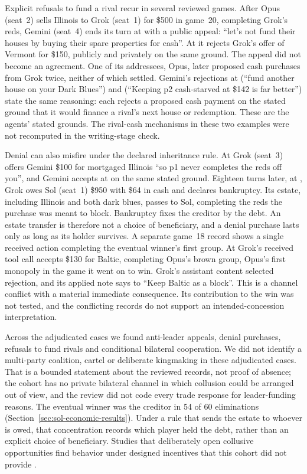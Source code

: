 Explicit refusals to fund a rival recur in several reviewed games. After Opus (seat~2) sells Illinois to Grok (seat~1) for \$500 in game~20, completing Grok's reds, Gemini (seat~4) ends its turn at  with a public appeal: ``let's not fund their houses by buying their spare properties for cash''. At  it rejects Grok's offer of Vermont for \$150, publicly and privately on the same ground. The appeal did not become an agreement. One of its addressees, Opus, later proposed cash purchases from Grok twice, neither of which settled. Gemini's rejections at  (``fund another house on your Dark Blues'') and  (``Keeping p2 cash-starved at \$142 is far better'') state the same reasoning: each rejects a proposed cash payment on the stated ground that it would finance a rival's next house or redemption. These are the agents' stated grounds. The rival-cash mechanisms in these two examples were not recomputed in the writing-stage check.

Denial can also misfire under the declared inheritance rule. At  Grok (seat~3) offers Gemini \$100 for mortgaged Illinois ``so p1 never completes the reds off you'', and Gemini accepts at  on the same stated ground. Eighteen turns later, at , Grok owes Sol (seat~1) \$950 with \$64 in cash and declares bankruptcy. Its estate, including Illinois and both dark blues, passes to Sol, completing the reds the purchase was meant to block. Bankruptcy fixes the creditor by the debt. An estate transfer is therefore not a choice of beneficiary, and a denial purchase lasts only as long as its holder survives. A separate game~18 record shows a single received action completing the eventual winner's first group. At  Grok's received tool call accepts \$130 for Baltic, completing Opus's brown group, Opus's first monopoly in the game it went on to win. Grok's assistant content selected rejection, and its applied note says to ``Keep Baltic as a block''. This is a channel conflict with a material immediate consequence. Its contribution to the win was not tested, and the conflicting records do not support an intended-concession interpretation.

Across the adjudicated cases we found anti-leader appeals, denial purchases, refusals to fund rivals and conditional bilateral cooperation. We did not identify a multi-party coalition, cartel or deliberate kingmaking in these adjudicated cases. That is a bounded statement about the reviewed records, not proof of absence; the cohort has no private bilateral channel in which collusion could be arranged out of view, and the review did not code every trade response for leader-funding reasons. The eventual winner was the creditor in 54 of 60 eliminations (Section~\ref{sec:sol-economic-results}). Under a rule that sends the estate to whoever is owed, that concentration records which player held the debt, rather than an explicit choice of beneficiary. Studies that deliberately open collusive opportunities find behavior under designed incentives that this cohort did not provide \citep{shi2026emergentcollusion}.

